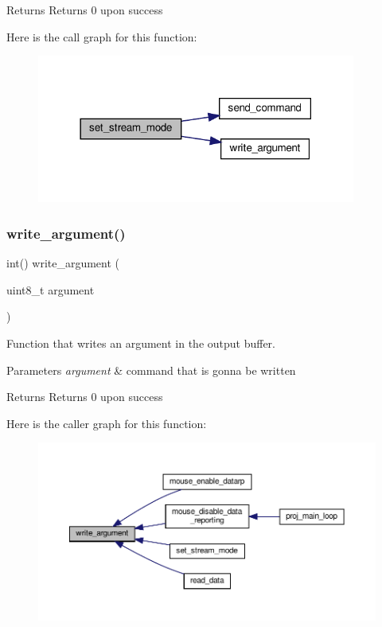 \begin{DoxyReturn}{Returns}
Returns 0 upon success 
\end{DoxyReturn}
Here is the call graph for this function\+:
\nopagebreak
\begin{figure}[H]
\begin{center}
\leavevmode
\includegraphics[width=297pt]{group__mouse_ga58c043049bb31ec7bad65594a8341a5d_cgraph}
\end{center}
\end{figure}
\mbox{\label{group__mouse_ga4f9755f5c9975e9b13daa3e34f26f5cf}} 
\subsubsection{\texorpdfstring{write\+\_\+argument()}{write\_argument()}}
{\footnotesize\ttfamily int() write\+\_\+argument (\begin{DoxyParamCaption}\item[{uint8\+\_\+t}]{argument }\end{DoxyParamCaption})}



Function that writes an argument in the output buffer. 


\begin{DoxyParams}{Parameters}
{\em argument} & command that is gonna be written\\
\hline
\end{DoxyParams}
\begin{DoxyReturn}{Returns}
Returns 0 upon success 
\end{DoxyReturn}
Here is the caller graph for this function\+:
\nopagebreak
\begin{figure}[H]
\begin{center}
\leavevmode
\includegraphics[width=350pt]{group__mouse_ga4f9755f5c9975e9b13daa3e34f26f5cf_icgraph}
\end{center}
\end{figure}
